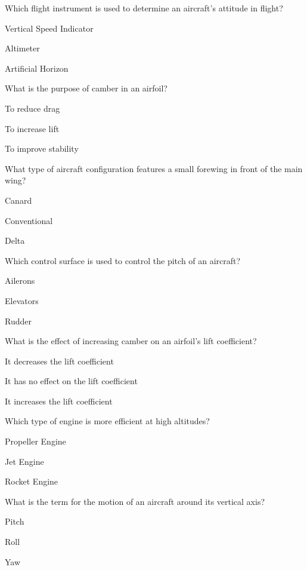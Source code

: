 
\begin{enhancedmcq}{Which flight instrument is used to determine an aircraft's attitude in flight?}
\item Vertical Speed Indicator
\item Altimeter
\item Artificial Horizon

\end{enhancedmcq}
\begin{enhancedmcq}{What is the purpose of camber in an airfoil?}
\item To reduce drag
\item To increase lift
\item To improve stability

\end{enhancedmcq}
\begin{enhancedmcq}{What type of aircraft configuration features a small forewing in front of the main wing?}
\item Canard
\item Conventional
\item Delta

\end{enhancedmcq}
\begin{enhancedmcq}{Which control surface is used to control the pitch of an aircraft?}
\item Ailerons
\item Elevators
\item Rudder

\end{enhancedmcq}
\begin{enhancedmcq}{What is the effect of increasing camber on an airfoil's lift coefficient?}
\item It decreases the lift coefficient
\item It has no effect on the lift coefficient
\item It increases the lift coefficient

\end{enhancedmcq}
\begin{enhancedmcq}{Which type of engine is more efficient at high altitudes?}
\item Propeller Engine
\item Jet Engine
\item Rocket Engine

\end{enhancedmcq}
\begin{enhancedmcq}{What is the term for the motion of an aircraft around its vertical axis?}
\item Pitch
\item Roll
\item Yaw

\end{enhancedmcq}
